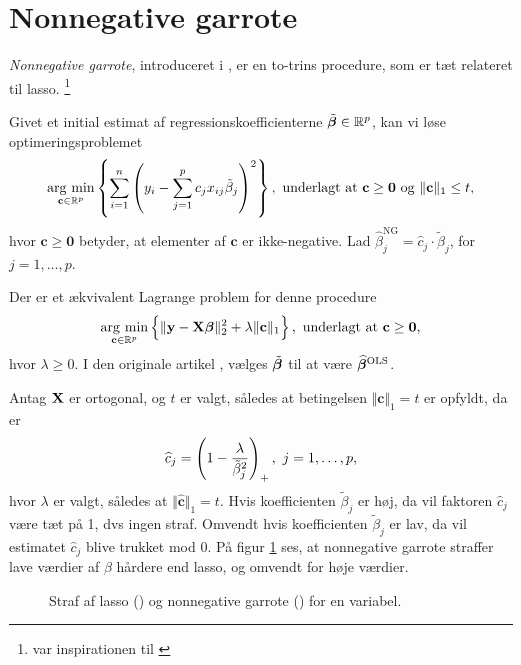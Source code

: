 \section{Nonnegative garrote} \label{sec:nonnegativegarrote}
\textit{Nonnegative garrote}, introduceret i \citep{nonnegative_garrote}, er en to-trins procedure, som er tæt relateret til lasso. \footnote{\citep{nonnegative_garrote} var inspirationen til \citep{lasso}} 
\begin{defn}
Givet et initial estimat af regressionskoefficienterne \(\tilde{\boldsymbol{\beta}} \in \mathbb{R}^p\), kan vi løse optimeringsproblemet
\begin{align}
\argmin_{\mathbf{c} \in \mathbb{R}^p}  \cbr{ \sum_{i=1}^n \del{y_i - \sum_{j=1}^p c_j x_{ij} \tilde{\beta}_j}^2}, \ \text{underlagt at } \mathbf{c} \geq \mathbf{0} \text{ og } \Vert \mathbf{c} \Vert_1 \leq t, \label{eq:2.19}
\end{align}
hvor \(\mathbf{c} \geq \mathbf{0}\) betyder, at elementer af \(\mathbf{c}\) er ikke-negative.
Lad \(\widehat{\beta}_j^\text{NG} = \widehat{c}_j \cdot \tilde{\beta}_j\), for \(j = 1, \ldots, p\).
\end{defn}
Der er et ækvivalent Lagrange problem for denne procedure
\begin{align}
\argmin_{\mathbf{c} \in \mathbb{R}^p}  \cbr{\Vert \y - \X \tbeta \Vert_2^2 + \lambda \Vert \mathbf{c} \Vert_1}, \ \text{underlagt at } \mathbf{c} \geq \mathbf{0}, \label{eq:nonnegative_garrote}
\end{align}
hvor \(\lambda \geq 0\).
I den originale artikel \citep{nonnegative_garrote}, vælges \(\tilde{\boldsymbol{\beta}}\) til at være \(\widehat{\boldsymbol{\beta}}^\text{OLS}\).
 
Antag \(\mathbf{X}\) er ortogonal, og \(t\) er valgt, således at betingelsen \(\Vert \mathbf{c} \Vert_1 = t\) er opfyldt, da er
\begin{align*}
\widehat{c}_j = \del{1 - \frac{\lambda}{\tilde{\beta}_j^2}}_+, \ j = 1, \ldots, p,
\end{align*}
hvor \(\lambda\) er valgt, således at \(\Vert \widehat{\mathbf{c}} \Vert_1 = t\).
Hvis koefficienten \(\tilde{\beta}_j\) er høj, da vil faktoren \(\widehat{c}_j\) være tæt på 1, dvs ingen straf.
Omvendt hvis koefficienten \(\tilde{\beta}_j\) er lav, da vil estimatet \(\widehat{c}_j\) blive trukket mod 0.
På figur \ref{fig:nonnegative_garrote} ses, at nonnegative garrote straffer lave værdier af \(\beta\) hårdere end lasso, og omvendt for høje værdier.
%
\begin{figure}[H]
\centering
\scalebox{0.8}{}
\caption[optional short text]{Straf af lasso () og nonnegative garrote () for en variabel. 
} \label{fig:nonnegative_garrote}
\end{figure}
%


